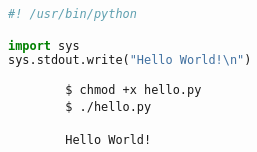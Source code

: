 \documentclass{article}
\begin{document}
\begin{file}[hello.py]
\begin{lstlisting}[language=Python]
#! /usr/bin/python

import sys
sys.stdout.write("Hello World!\n")
\end{lstlisting}
\end{file}

\begin{commandline}
	\begin{verbatim}
		$ chmod +x hello.py
		$ ./hello.py

		Hello World!
	\end{verbatim}
\end{commandline}

\newpage

\end{document}
